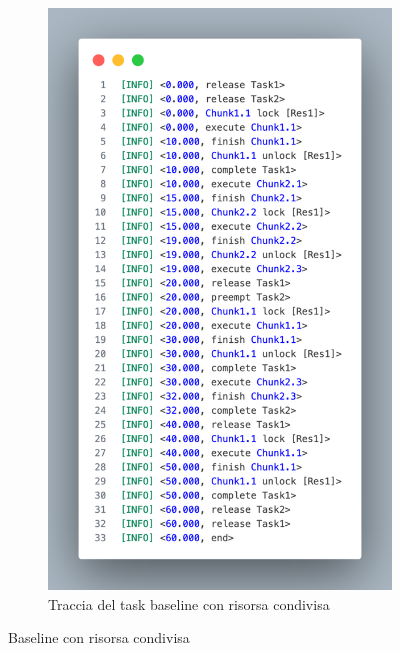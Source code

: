 \begin{figure}[htbp]
\begin{subfigure}{0.45\textwidth}
        \includegraphics[width=.9\textwidth]{immagini/trace baseline con risorse.pdf}
        \caption{Traccia del task baseline con risorsa condivisa}
        \label{fig:baselineTraceWRes}
        \vfill
    \end{subfigure}
    \caption{Baseline con risorsa condivisa}
\end{figure}